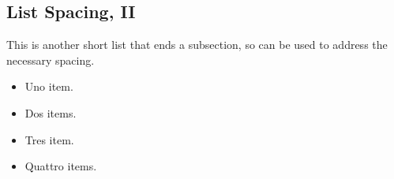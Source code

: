\documentclass[10pt,]{article}
\theoremstyle{plain}
\theoremstyle{definition}
\theoremstyle{definition}
\theoremstyle{definition}
\theoremstyle{definition}
\theoremstyle{definition}
\theoremstyle{definition}
\numberwithin{equation}{section}
\begin{document}
\subsection[{List Spacing, II}]{List Spacing, II}\label{subsection-30}
\hypertarget{p-398}{}%
This is another short list that ends a subsection, so can be used to address the necessary spacing.\leavevmode%
\begin{multicols}{2}
\begin{itemize}[label=\textbullet]
\item{}Uno item.%
\item{}Dos items.%
\item{}Tres item.%
\item{}Quattro items.%
\end{itemize}
\end{multicols}
%
\typeout{************************************************}
\typeout{************************************************}
\end{document}
